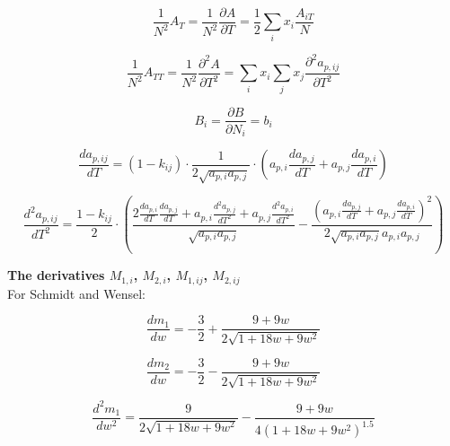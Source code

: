 \documentclass[a4paper, 12pt, english, sintefheadings, sintefcolour]{sintefmemo}
\begin{document}
\noindent\hrulefill

\begin{equation}
\frac{1}{N^2}A_{T}=\frac{1}{N^2}\frac{\partial A}{\partial T}=\frac{1}{2}\sum_ix_i\frac{A_{iT}}{N}
\end{equation}

\noindent\hrulefill

\begin{equation}
\frac{1}{N^2}A_{TT}=\frac{1}{N^2}\frac{\partial^2 A}{\partial T^2}=\sum_i x_i \sum_j x_j\frac{\partial^2 a_{p,ij}}{\partial T^2}
\end{equation}

\noindent\hrulefill

\begin{equation}
B_{i}=\frac{\partial B}{\partial N_i}=b_i
\end{equation}

\noindent\hrulefill

\begin{equation}
\frac{da_{p,ij}}{dT}=\left(1-k_{ij}\right)\cdot\frac{1}{2\sqrt{a_{p,i}a_{p,j}}}\cdot\left(a_{p,i}\frac{da_{p,j}}{dT}+a_{p,j}\frac{da_{p,i}}{dT}\right)
\end{equation}

\noindent\hrulefill

\begin{equation}
\frac{d^2a_{p,ij}}{dT^2}=\frac{1-k_{ij}}{2}\cdot\left(\frac{2\frac{da_{p,i}}{dT}\frac{da_{p,j}}{dT}+a_{p,i}\frac{d^2a_{p,j}}{dT^2}+a_{p,j}\frac{d^2a_{p,i}}{dT^2}}{\sqrt{a_{p,i}a_{p,j}}}-\frac{\left(a_{p,i}\frac{da_{p,j}}{dT}+a_{p,j}\frac{da_{p,i}}{dT}\right)^2}{2\sqrt{a_{p,i}a_{p,j}}a_{p,i}a_{p,j}}\right)
\end{equation}


\noindent\hrulefill

\textbf{The derivatives $M_{1,i}$, $M_{2,i}$, $M_{1,ij}$, $M_{2,ij}$}\\

For Schmidt and Wensel:

\begin{equation}
\frac{dm_1}{dw}=-\frac{3}{2}+\frac{9+9w}{2\sqrt{1+18w+9w^2}}
\end{equation}

\begin{equation}
\frac{dm_2}{dw}=-\frac{3}{2}-\frac{9+9w}{2\sqrt{1+18w+9w^2}}
\end{equation}

\begin{equation}
\frac{d^2m_1}{dw^2}=\frac{9}{2\sqrt{1+18w+9w^2}}-\frac{9+9w}{4\left(1+18w+9w^2\right)^{1.5}}
\end{equation}
\end{document}
